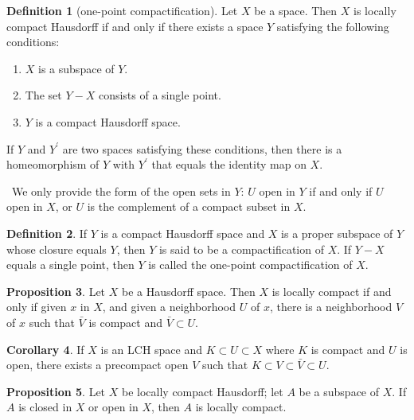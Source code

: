 \documentclass[12pt,a4paper]{book}
\newenvironment{prooff}{{\noindent\it\textcolor{cyan!40!black}{Proof}:}\,}{\par}
\newenvironment{enu}{\begin{enumerate}[(1)]}{\end{enumerate}}
\theoremstyle{definition}
\newtheorem{defn}{Definition}[section]
\newtheorem{coro}[defn]{Corollary}
\newtheorem{prop}[defn]{Proposition}
\begin{document}
\begin{defn}[one-point compactification]
    Let $X$ be a space. Then $X$ is locally compact Hausdorff if and only if there exists a space $Y$ satisfying the following conditions:
    \begin{enu}
        \item $X$ is a subspace of $Y$.
        \item The set $Y-X$ consists of a single point.
        \item $Y$ is a compact Hausdorff space.
    \end{enu}

    If $Y$ and $Y^{\prime}$ are two spaces satisfying these conditions, then there is a homeomorphism of $Y$ with $Y^{\prime}$ that equals the identity map on $X$.
\end{defn}
\begin{prooff}
    We only provide the form of the open sets in $Y$: $U$ open in $Y$ if and only if $U$ open in $X$, or $U$ is the complement of a compact subset in $X$.
\end{prooff}
\begin{defn}
    If $Y$ is a compact Hausdorff space and $X$ is a proper subspace of $Y$ whose closure equals $Y$, then $Y$ is said to be a compactification of $X$. If $Y-X$ equals a single point, then $Y$ is called the one-point compactification of $X$.
\end{defn}
\begin{prop}
    Let $X$ be a Hausdorff space. Then $X$ is locally compact if and only if given $x$ in $X$, and given a neighborhood $U$ of $x$, there is a neighborhood $V$ of $x$ such that $\bar{V}$ is compact and $\bar{V} \subset U$.
    \label{proposition: LCH if and only if}
\end{prop}
\begin{coro}
    If $X$ is an LCH space and $K \subset U \subset X$ where $K$ is compact and $U$ is open,
    there exists a precompact open $V$ such that $K \subset V \subset \bar{V} \subset U$.
\end{coro}
\begin{prop}
    Let $X$ be locally compact Hausdorff; let $A$ be a subspace of $X$. If $A$ is closed in $X$ or open in $X$, then $A$ is locally compact.
\end{prop}
\end{document}
